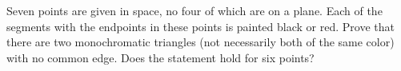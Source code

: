 Seven points are given in space, no four of which are on a plane. Each of the segments with the endpoints in these points is painted black or red. Prove that there are two monochromatic triangles (not necessarily both of the same color) with no common edge. Does the statement hold for six points?
